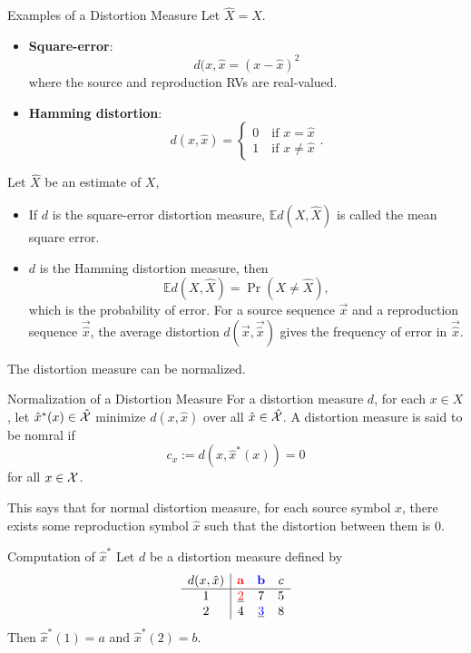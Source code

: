 \documentclass[../main.tex]{subfiles}
\begin{document}
\begin{pbox}{Examples of a Distortion Measure}
Let $\hat X = X$.
\begin{itemize}
    \item \textbf{Square-error}: \[
    d(x,\hat x = (x-\hat x)^2 
    \] where the source and reproduction RVs are real-valued.
    \item \textbf{Hamming distortion}: \[
    d(x,\hat x) = \begin{cases}
        0\quad \text{if $x=\hat x$}\\
        1 \quad \text{if $x\neq \hat x$}
    \end{cases}.
    \]
\end{itemize}
Let $\hat X$ be an estimate of $X$, \begin{itemize}
    \item If $d$ is the square-error distortion measure, $\mathbb{E} d(X,\hat X)$ is called the mean square error.
    \item $d$ is the Hamming distortion measure, then \[
    \mathbb E d(X,\hat X) = \Pr(X\neq \hat X),
    \]
    which is the probability of error. For a source sequence $\vec x$ and a reproduction sequence $\vec{\hat x}$, the average distortion $d(\vec x,\vec{\hat x})$ gives the frequency of error in $\vec{\hat x}$.
\end{itemize}
\end{pbox}
The distortion measure can be normalized.
\begin{gbox}{Normalization of a Distortion Measure}
    For a distortion measure $d$, for each $x\in X$, let $\hat x^*(x)\in \hat {\mathcal{X}}$ minimize $d(x,\hat x)$ over all $\hat x\in \hat {\mathcal{X}}$. A distortion measure is said to be nomral if \[
    c_x := d(x,\hat x^*(x))=0
    \] for all $x\in \mathcal{X}$.
    \begin{remark}
        This says that for normal distortion measure, for each source symbol $x$, there exists some reproduction symbol $\hat x$ such that the distortion between them is $0$.
    \end{remark}
\end{gbox}
\begin{pbox}{Computation of $\hat x^*$}
    Let $d$ be a distortion measure defined by 
    \[
\begin{array}{c|ccc}
d(x, \hat{x}) & \textcolor{red}{\mathbf{a}} & \textcolor{blue}{\mathbf{b}} & c \\
\hline
1 & \underline{\textcolor{red}{2}} & 7 & 5 \\
2 & 4 & \underline{\textcolor{blue}{3}} & 8 \\
\end{array}
\]
Then $\hat x^*(1)=a$ and $\hat x^*(2) = b.$
\end{pbox}
\end{document}
